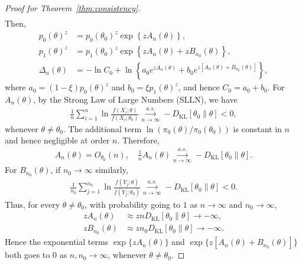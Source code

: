 \documentclass[12pt]{article}
\begin{document}
\begin{proof}[Proof for Theorem~\ref{thm:consistency}]
\begin{align*}
    \end{align*}
    Then,
    \begin{align*}
        p_0(\theta)^z &= p_0(\theta_0)^z\exp\left\{z A_n(\theta)\right\}, \\
        p_1(\theta)^z &= p_1(\theta_0)^z\exp\left\{z A_n(\theta) + z B_{n_0}(\theta)\right\}, \\
        \Delta_n(\theta) &= -\ln C_0 + \ln \left\{a_0 e^{z A_n(\theta)} + b_0 e^{z\left[A_n(\theta) + B_{n_0}(\theta)\right]}\right\},
    \end{align*}
    where $a_0 = (1 - \xi)p_0(\theta)^z$ and $b_0 = \xi p_1(\theta)^z$, and hence $C_0 = a_0 + b_0$.
    For $A_n(\theta)$, by the Strong Law of Large Numbers (SLLN), we have
    \begin{align*}
        \frac{1}{n}\sum^n_{i=1}\ln\frac{f(X_i; \theta)}{f(X_i; \theta_0)} \overset{a.s.}{\underset{n\to\infty}{\to}} - D_{\mathrm{KL}}[\theta_0 \| \theta] < 0,
    \end{align*}
    whenever $\theta \neq \theta_0$.
    The additional term $\ln(\pi_0(\theta) / \pi_0(\theta_0))$ is constant in $n$ and hence negligible at order $n$.
    Therefore,
    \begin{align*}
        A_n(\theta) = O_{\theta_0}(n), \quad \frac{1}{n}A_n(\theta) \overset{a.s.}{\underset{n\to\infty}{\to}} -D_{\mathrm{KL}}[\theta_0 \| \theta].
    \end{align*}
    For $B_{n_0}(\theta)$, if $n_0 \to \infty$ similarly,
    \begin{align*}
        \frac{1}{n_0}\sum^{n_0}_{j=1}\ln\frac{f(Y_j ; \theta)}{f(Y_j; \theta_0)} \overset{a.s.}{\underset{n\to\infty}{\to}} -D_{\mathrm{KL}}[\theta_0 \| \theta] < 0.
    \end{align*}
    Thus, for every $\theta \neq \theta_0$, with probability going to $1$ as $n \to \infty$ and $n_0 \to \infty$,
    \begin{align*}
        z A_n(\theta) &\approx z n D_{\mathrm{KL}}[\theta_0 \| \theta] \to -\infty, \\
        z B_{n_0}(\theta) &\approx z n_0 D_{\mathrm{KL}}[\theta_0 \| \theta] \to -\infty.
    \end{align*}
    Hence the exponential terms $\exp\{z A_n(\theta)\}$ and $\exp\{z [A_n(\theta) + B_{n_0}(\theta)]\}$ both goes to $0$ as $n, n_0 \to \infty$, whenever $\theta \neq \theta_0$.


\end{proof}
\end{document}
